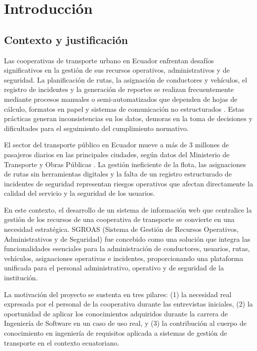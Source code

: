 \chapter{Introducción}
\label{cap:introduccion}

\section{Contexto y justificación}
\label{sec:contexto}

Las cooperativas de transporte urbano en Ecuador enfrentan desafíos significativos en la gestión de sus recursos operativos, administrativos y de seguridad. La planificación de rutas, la asignación de conductores y vehículos, el registro de incidentes y la generación de reportes se realizan frecuentemente mediante procesos manuales o semi-automatizados que dependen de hojas de cálculo, formatos en papel y sistemas de comunicación no estructurados \cite{sommerville2015}. Estas prácticas generan inconsistencias en los datos, demoras en la toma de decisiones y dificultades para el seguimiento del cumplimiento normativo.

El sector del transporte público en Ecuador mueve a más de 3 millones de pasajeros diarios en las principales ciudades, según datos del Ministerio de Transporte y Obras Públicas \cite{mtop2024}. La gestión ineficiente de la flota, las asignaciones de rutas sin herramientas digitales y la falta de un registro estructurado de incidentes de seguridad representan riesgos operativos que afectan directamente la calidad del servicio y la seguridad de los usuarios.

En este contexto, el desarrollo de un sistema de información web que centralice la gestión de los recursos de una cooperativa de transporte se convierte en una necesidad estratégica. SGROAS (Sistema de Gestión de Recursos Operativos, Administrativos y de Seguridad) fue concebido como una solución que integra las funcionalidades esenciales para la administración de conductores, usuarios, rutas, vehículos, asignaciones operativas e incidentes, proporcionando una plataforma unificada para el personal administrativo, operativo y de seguridad de la institución.

La motivación del proyecto se sustenta en tres pilares: (1) la necesidad real expresada por el personal de la cooperativa durante las entrevistas iniciales, (2) la oportunidad de aplicar los conocimientos adquiridos durante la carrera de Ingeniería de Software en un caso de uso real, y (3) la contribución al cuerpo de conocimiento en ingeniería de requisitos aplicada a sistemas de gestión de transporte en el contexto ecuatoriano.

